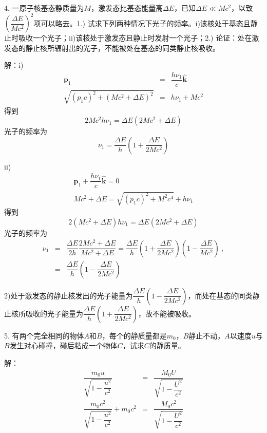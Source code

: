 \documentclass[11pt,a4paper]{article}
\renewcommand{\vec}[1]{\boldsymbol{#1}}
\begin{document}
4. 一原子核基态静质量为$M$，激发态比基态能量高$\Delta E$，已知$\Delta E \ll Mc^2$，以致$\left(\dfrac{\Delta E}{Mc^2}\right)^2$项可以略去。1.) 试求下列两种情况下光子的频率。i)该核处于基态且静止时吸收一个光子；ii)该核处于激发态且静止时发射一个光子；2.) 论证：处在激发态的静止核所辐射出的光子，不能被处在基态的同类静止核吸收。

解：i)
\begin{eqnarray*}
\vec{p}_1 &=& \dfrac{h \nu_1}{c} \vec{\hat{k}}~\\
\sqrt{(p_1c)^2 +(Mc^2 +\Delta E)^2} &=& h\nu_1 +Mc^2
\end{eqnarray*}
得到
\begin{equation*}
2Mc^2 h\nu_1 = \Delta E (2Mc^2 +\Delta E)
\end{equation*}
光子的频率为
\begin{equation*}
\nu_1 = \frac{\Delta E}{h}\left(1+\frac{\Delta E}{2Mc^2} \right)
\end{equation*}

ii)
\begin{eqnarray*}
\vec{p}_1 + \dfrac{h \nu_1}{c} \vec{\hat{k}} = 0~\\
Mc^2 +\Delta E = \sqrt{(p_1c)^2 +M^2c^4} + h\nu_1
\end{eqnarray*}
得到
\begin{equation*}
2(Mc^2 + \Delta E)h\nu_1 = \Delta E (2Mc^2 +\Delta E)
\end{equation*}
光子的频率为
\begin{eqnarray*}
\nu_1 &=& \dfrac{\Delta E}{2h} \dfrac{2Mc^2 +\Delta E}{Mc^2 + \Delta E} = \dfrac{\Delta E}{h} \left(1+\dfrac{\Delta E}{2Mc^2} \right) \left(1- \dfrac{\Delta E}{Mc^2}\right) ~,\\
&=& \dfrac{\Delta E}{h} \left(1-\dfrac{\Delta E}{2Mc^2} \right)
\end{eqnarray*}

2)处于激发态的静止核发出的光子能量为$\dfrac{\Delta E}{h} \left(1-\dfrac{\Delta E}{2Mc^2} \right)$，而处在基态的同类静止核所吸收的光子能量为$\dfrac{\Delta E}{h} \left(1+\dfrac{\Delta E}{2Mc^2} \right)$，故不能被吸收。

5. 有两个完全相同的物体$A$和$B$，每个的静质量都是$m_0$，$B$静止不动，$A$以速度$u$与$B$发生对心碰撞，碰后粘成一个物体$C$，试求$C$的静质量。

解：
\begin{eqnarray*}
\dfrac{m_0 u}{\sqrt{1-\dfrac{u^2}{c^2}}}  &=& \dfrac{M_0U}{\sqrt{1-\dfrac{U^2}{c^2}}} \\
\dfrac{m_0 c^2}{\sqrt{1-\dfrac{u^2}{c^2}}}  + m_0 c^2 &=& \dfrac{M_0 c^2}{\sqrt{1-\dfrac{U^2}{c^2}}}
\end{eqnarray*}
\end{document}
